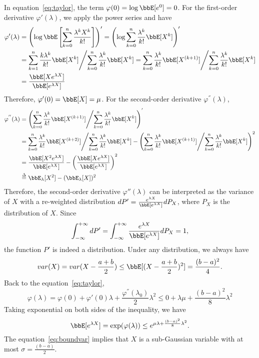 \documentclass[11pt]{article}
\theoremstyle{plain}
\theoremstyle{definition}
\begin{document}
In equation~\eqref{eq:taylor}, the term $\varphi(0) =\log \bbE[e^{0}] = 0$. For the first-order derivative $\varphi'(\lambda)$, we apply the power series and have
\begin{align}
	\varphi'(\lambda ) &= \left( \log \bbE \left[ \sum_{k = 0}^n \frac{\lambda^k X^k}{k!} \right]   \right)' = \left( \log \sum_{k = 0}^n \frac{\lambda^k }{k!} \bbE[X^k]  \right)' \\
	&= {\sum_{k = 1}^n \frac{k \lambda^k }{k!} \bbE[X^k] }\Bigg/{\sum_{k = 0}^n \frac{\lambda^k }{k!} \bbE[X^k]} = {\sum_{k = 0}^n \frac{ \lambda^k }{k!} \bbE[X^{(k+1)}] }\Bigg/{\sum_{k = 0}^n \frac{\lambda^k }{k!} \bbE[X^k]} \\
	&= \frac{\bbE[X e^{\lambda X} ]}{\bbE[ e^{\lambda X} ]}
\end{align}
Therefore, $\varphi'(0) = \bbE[X] = \mu$. For the second-order derivative $\varphi^{''}(\lambda)$,
\begin{align}
	\varphi^{''}(\lambda) &= \left( {\sum_{k = 0}^n \frac{ \lambda^k }{k!} \bbE[X^{(k+1)}] }\Bigg/{\sum_{k = 0}^n \frac{\lambda^k }{k!} \bbE[X^k]} \right)^{'} \\
	&= {\sum_{k = 0}^n \frac{ \lambda^k }{k!} \bbE[X^{(k+2)}] }\Bigg/{\sum_{k = 0}^n \frac{\lambda^k }{k!} \bbE[X^k]} - \left( {\sum_{k = 0}^n \frac{ \lambda^k }{k!} \bbE[X^{(k+1)}] }\Bigg/{\sum_{k = 0}^n \frac{\lambda^k }{k!} \bbE[X^k]}  \right)^2\\
	&= \frac{\bbE[X^2 e^{\lambda X} ]}{\bbE[ e^{\lambda X} ]} - \left( \frac{\bbE[X e^{\lambda X} ]}{\bbE[ e^{\lambda X} ]} \right)^2\\
	& \overset{\Delta}{=} \bbE_{\lambda} [X^2] - (\bbE_{\lambda} [X])^2
\end{align}
Therefore, the second-order derivative $\varphi''(\lambda)$ can be interpreted as the variance of $X$ with a re-weighted distribution $d P' = \frac{e^{\lambda X}}{\bbE[ e^{\lambda X} ]} d P_X $, where $P_X$ is the distribution of $X$. Since 
\[ \int_{-\infty}^{+\infty} d P' = \int_{-\infty}^{+\infty}  \frac{e^{\lambda X}}{\bbE[ e^{\lambda X} ]} d P_X = 1, \]
the function $P'$ is indeed a distribution. Under any distribution, we always have
\[ var(X) = var(X - \frac{a+b}{2}) \leq \bbE[(X - \frac{a+b}{2} )^2] = \frac{(b-a)^2}{4}. \]
Back to the equation~\eqref{eq:taylor},
\[\varphi(\lambda) =  \varphi(0) + \varphi'(0) \lambda  + \frac{\varphi^{''}(\lambda_0) }{2} \lambda^2 \leq 0 + \lambda \mu+ \frac{(b-a)^2}{8} \lambda^2 \]
Taking exponential on both sides of the inequality, we have
\begin{equation}\label{eq:boundvar}
	\bbE[e^{\lambda X}] = \exp(\varphi( \lambda)) \leq e^{\mu \lambda + \frac{(b-a)^2}{8} \lambda^2}.
\end{equation}
The equation~\eqref{eq:boundvar} implies that $X$ is a sub-Gaussian variable with at most $\sigma = \frac{(b-a)}{2}$.
\end{document}

